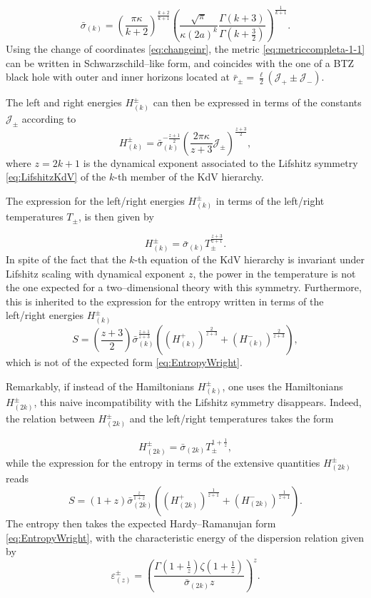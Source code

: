 \documentclass[letterpaper,11pt,oneside]{book}
\begin{document}
\[
\bar{\sigma}_{\left(k\right)}=\left(\frac{\pi\kappa}{k+2}\right)^{\frac{k+2}{k+1}}\left(\frac{\sqrt{\pi}}{\kappa\left(2a\right)^{k}}\frac{\Gamma\left(k+3\right)}{\Gamma\left(k+\frac{3}{2}\right)}\right)^{\frac{1}{k+1}}.
\]
Using the change of coordinates \eqref{eq:changeinr}, the metric
\eqref{eq:metriccompleta-1-1} can be written in Schwarzschild--like
form, and coincides with the one of a BTZ black hole with outer and
inner horizons located at $\bar{r}_{\pm}=\frac{\ell}{2}\left(\mathcal{J}_{+}\pm\mathcal{J}_{-}\right)$.

The left and right energies $H_{\left(k\right)}^{\pm}$ can then be
expressed in terms of the constants $\mathcal{J}_{\pm}$ according
to
\begin{equation}
	H_{\left(k\right)}^{\pm}=\bar{\sigma}_{\left(k\right)}^{-\frac{z+1}{2}}\left(\frac{2\pi\kappa}{z+3}\mathcal{J}_{\pm}\right)^{\frac{z+3}{2}},\label{eq:HdeJKdV}
\end{equation}
where $z=2k+1$ is the dynamical exponent associated to the Lifshitz
symmetry \eqref{eq:LifshitzKdV} of the $k$-th member of the KdV
hierarchy.

The expression for the left/right energies $H_{\left(k\right)}^{\pm}$
in terms of the left/right temperatures $T_{\pm}$, is then given
by

\[
H_{\left(k\right)}^{\pm}=\bar{\sigma}_{\left(k\right)}T_{\pm}^{\frac{z+3}{z+1}}.
\]
In spite of the fact that the $k$-th equation of the KdV hierarchy
is invariant under Lifshitz scaling with dynamical exponent $z$,
the power in the temperature is not the one expected for a two--dimensional
theory with this symmetry. Furthermore, this is inherited to the expression
for the entropy written in terms of the left/right energies $H_{\left(k\right)}^{\pm}$
\[
S=\left(\frac{z+3}{2}\right)\bar{\sigma}_{\left(k\right)}^{\frac{z+1}{z+3}}\left(\left(H_{\left(k\right)}^{+}\right)^{\frac{2}{z+3}}+\left(H_{\left(k\right)}^{-}\right)^{\frac{2}{z+3}}\right),
\]
which is not of the expected form \eqref{eq:EntropyWright}.

Remarkably, if instead of the Hamiltonians $H_{\left(k\right)}^{\pm}$,
one uses the Hamiltonians $H_{\left(2k\right)}^{\pm}$, this naive
incompatibility with the Lifshitz symmetry disappears. Indeed, the
relation between $H_{\left(2k\right)}^{\pm}$ and the left/right temperatures
takes the form

\[
H_{\left(2k\right)}^{\pm}=\bar{\sigma}_{\left(2k\right)}T_{\pm}^{1+\frac{1}{z}},
\]
while the expression for the entropy in terms of the extensive quantities
$H_{\left(2k\right)}^{\pm}$ reads
\[
S=\left(1+z\right)\bar{\sigma}_{\left(2k\right)}^{\frac{z}{1+z}}\left(\left(H_{\left(2k\right)}^{+}\right)^{\frac{1}{z+1}}+\left(H_{\left(2k\right)}^{-}\right)^{\frac{1}{z+1}}\right).
\]
The entropy then takes the expected Hardy--Ramanujan form \eqref{eq:EntropyWright},
with the characteristic energy of the dispersion relation given by
\[
\varepsilon_{\left(z\right)}^{\pm}=\left(\frac{\Gamma\left(1+\frac{1}{z}\right)\zeta\left(1+\frac{1}{z}\right)}{\bar{\sigma}_{\left(2k\right)}z}\right)^{z}.
\]
\end{document}
